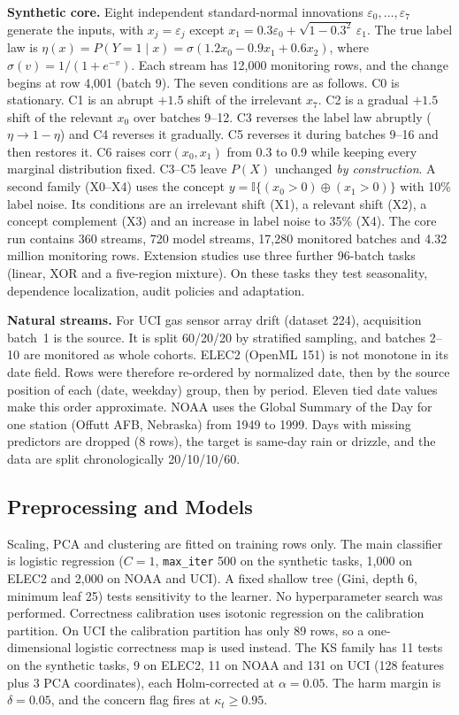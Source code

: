 \textbf{Synthetic core.} Eight independent standard-normal innovations
$\varepsilon_0,\dots,\varepsilon_7$ generate the inputs, with $x_j=\varepsilon_j$ except
$x_1=0.3\varepsilon_0+\sqrt{1-0.3^2}\,\varepsilon_1$. The true label law is
$\eta(x)=P(Y{=}1\mid x)=\sigma(1.2x_0-0.9x_1+0.6x_2)$, where $\sigma(v)=1/(1+e^{-v})$. Each stream has 12,000 monitoring rows,
and the change begins at row 4,001 (batch 9). The seven conditions are as follows.
C0 is stationary. C1 is an abrupt $+1.5$ shift of the irrelevant $x_7$. C2 is a gradual
$+1.5$ shift of the relevant $x_0$ over batches 9--12. C3 reverses the label law
abruptly ($\eta\rightarrow1-\eta$) and C4 reverses it gradually. C5 reverses it during
batches 9--16 and then restores it. C6 raises $\mathrm{corr}(x_0,x_1)$ from 0.3 to 0.9
while keeping every marginal distribution fixed. C3--C5 leave $P(X)$ unchanged
\emph{by construction}. A second family (X0--X4) uses the concept
$y=\mathbb{I}\{(x_0>0)\oplus(x_1>0)\}$ with 10\% label noise. Its conditions are an
irrelevant shift (X1), a relevant shift (X2), a concept complement (X3) and an increase
in label noise to 35\% (X4). The core run contains 360 streams, 720 model streams,
17,280 monitored batches and 4.32 million monitoring rows.
Extension studies use three further 96-batch tasks (linear, XOR and a five-region
mixture). On these tasks they test seasonality, dependence localization, audit
policies and adaptation.

\textbf{Natural streams.} For UCI gas sensor array drift (dataset 224), acquisition
batch~1 is the source. It is split 60/20/20 by stratified sampling, and batches 2--10
are monitored as whole cohorts. ELEC2 (OpenML 151) is not monotone in its date field.
Rows were therefore re-ordered by normalized date, then by the source position of each
(date, weekday) group, then by period. Eleven tied date values make this order
approximate. NOAA uses the Global Summary of the Day for one station (Offutt AFB,
Nebraska) from 1949 to 1999. Days with missing predictors are dropped (8 rows), the
target is same-day rain or drizzle, and the data are split chronologically 20/10/10/60.

\subsection{Preprocessing and Models}
Scaling, PCA and clustering are fitted on training rows only. The main classifier is
logistic regression ($C=1$, \texttt{max\_iter} 500 on the synthetic tasks, 1,000 on
ELEC2 and 2,000 on NOAA and UCI). A fixed shallow tree (Gini, depth 6, minimum leaf 25)
tests sensitivity to the learner. No hyperparameter search was performed. Correctness
calibration uses isotonic regression on the calibration partition. On UCI the
calibration partition has only 89 rows, so a one-dimensional logistic correctness map
is used instead. The KS family has 11 tests on the synthetic tasks, 9 on ELEC2, 11 on
NOAA and 131 on UCI (128 features plus 3 PCA coordinates), each Holm-corrected at
$\alpha=0.05$. The harm margin is $\delta=0.05$, and the concern flag fires at
$\kappa_t\ge0.95$.

